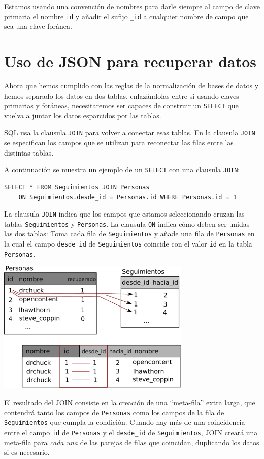 Estamos usando una
convención de nombres para darle siempre al campo de clave primaria el nombre
{\tt id} y añadir el sufijo \verb"_id" a cualquier nombre de campo
que sea una clave foránea.

\section{Uso de JSON para recuperar datos}

Ahora que hemos cumplido con las reglas de la normalización de bases de datos
y hemos separado los datos en dos tablas, enlazándolas entre sí usando
claves primarias y foráneas, necesitaremos ser capaces de construir un
{\tt SELECT} que vuelva a juntar los datos esparcidos por las tablas.

SQL usa la clausula {\tt JOIN} para volver a conectar esas tablas.
En la clausula {\tt JOIN} se especifican los campos que se utilizan
para reconectar las filas entre las distintas tablas.

A continuación se muestra un ejemplo de un {\tt SELECT} con una
clausula {\tt JOIN}:

\beforeverb
\begin{verbatim}
SELECT * FROM Seguimientos JOIN Personas 
    ON Seguimientos.desde_id = Personas.id WHERE Personas.id = 1
\end{verbatim}
\afterverb
%
La clausula {\tt JOIN} indica que los campos que estamos seleccionando
cruzan las tablas {\tt Seguimientos} y {\tt Personas}. La clausula
{\tt ON} indica cómo deben ser unidas las dos tablas: Toma cada fila
de {\tt Seguimientos} y añade una fila de {\tt Personas} en la cual el
campo \verb"desde_id" de {\tt Seguimientos} coincide con el valor {\tt id}
en la tabla {\tt Personas}.

\beforefig
\centerline{\includegraphics[height=2.50in]{figs2/join.eps}}
\afterfig

El resultado del JOIN consiste en la creación de una ``meta-fila'' extra larga, que contendrá
tanto los campos de {\tt Personas} como los campos de la fila de {\tt Seguimientos} que cumpla la
condición.
Cuando hay más de una coincidencia entre el campo {\tt id} de {\tt Personas}
y el \verb"desde_id" de {\tt Seguimientos}, JOIN creará una meta-fila
para \emph{cada una} de las parejas de filas que coincidan, duplicando los datos si es necesario.

